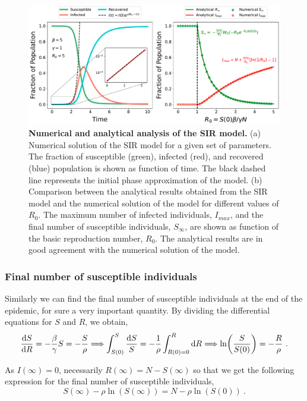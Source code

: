 \begin{figure}[H]
  \centering
  \includegraphics[width=1\textwidth]{Figures/SIR_model_analysis.pdf}
  \caption[Numerical and analytical analysis of the SIR model.]{\label{fig:
      SIR_model} \textbf{Numerical and analytical analysis of the SIR model.}
    (a) Numerical solution of the SIR model for a given set of parameters. The
    fraction of susceptible (green), infected (red), and recovered (blue)
    population is shown as function of time. The black dashed line represents
    the initial phase approximation of the model. (b) Comparison between the
    analytical results obtained from the SIR model and the numerical solution
    of the model for different values of $R_0$. The maximum number of infected
    individuals, $I_{max}$, and the final number of susceptible individuals,
    $S_{\infty}$, are shown as function of the basic reproduction number,
    $R_0$. The analytical results are in good agreement with the numerical
    solution of the model.
  }
\end{figure}

\subsubsection*{Final number of susceptible individuals}

Similarly we can find the final number of susceptible individuals at the end
of
the epidemic, for sure a very important quantity. By dividing the
differential
equations for $S$ and $R$, we obtain,
\begin{equation*}
  \frac{\mathrm{d} S}{\mathrm{d} R} = -\frac{\beta}{\gamma}S=-\frac{S}{\rho}
  \Longrightarrow\int_{S(0)}^S\frac{\mathrm{d}
    S}{S}=-\frac{1}{\rho}\int_{R(0)=0}^R\mathrm{d}
  R\Longrightarrow\ln(\frac{S}{S(0)})=-\frac{R}{\rho} \ .
\end{equation*}

As $I(\infty)=0$, necessarily $R(\infty)=N-S(\infty)$ so that we get the
following expression for the final number of susceptible individuals,
\begin{equation}\label{eq: trascendental_S_inf}
  S(\infty) - \rho\ln(S(\infty))=N-\rho\ln(S(0)) \ .
\end{equation}


